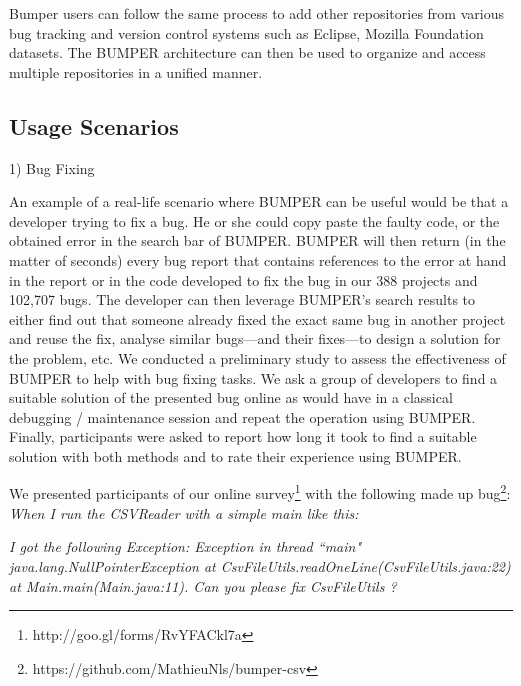 \documentclass[conference]{IEEEtran}
\begin{document}
Bumper users can follow the same process to add other repositories from various bug tracking and version control
systems such as Eclipse, Mozilla Foundation datasets. The BUMPER architecture can then be used to organize and
access multiple repositories in a unified manner.


\subsection{Usage Scenarios}
\label{sub:Bumper Data Repository}

1)	Bug Fixing

An example of a real-life scenario where BUMPER can be useful would be that a developer trying to fix a bug. He or she could copy paste the faulty code, or the obtained error in the search bar of BUMPER. BUMPER will then return (in the matter of seconds) every bug report that contains references to the error at hand in the report or in the code developed to fix the bug in our 388 projects and 102,707 bugs. The developer can then leverage BUMPER’s search results to either find out that someone already fixed the exact same bug in another project and reuse the fix, analyse similar bugs—and their fixes—to design a solution for the problem, etc. 
We conducted a preliminary study to assess the effectiveness of BUMPER to help with bug fixing tasks. 
We ask a group of developers to find a suitable solution of the presented bug online as would have in a classical debugging / maintenance session and repeat the operation using BUMPER.
Finally, participants were asked to report how long it took to find a suitable solution with both methods and to rate their experience using BUMPER.

We presented participants of our online survey\footnote{http://goo.gl/forms/RvYFACkl7a} with the following made up bug\footnote{https://github.com/MathieuNls/bumper-csv}: \textit{When I run the CSVReader with a simple main like this:}

\noindent\begin{minipage}{0.90\linewidth}

  

\end{minipage}

\textit{I got the following Exception: Exception in thread ``main" java.lang.NullPointerException at CsvFileUtils.readOneLine(CsvFileUtils.java:22) at Main.main(Main.java:11). Can you please fix CsvFileUtils ?}
\end{document}
